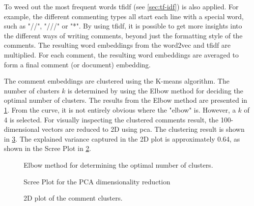 To weed out the most frequent words \acrfull{tfidf} (see \cref{sec:tf-idf}) is also applied. For example, the different commenting types all start each line with a special word, such as "//", "///" or "*". By using \acrshort{tfidf}, it is possible to get more insights into the different ways of writing comments, beyond just the formatting style of the comments. The resulting word embeddings from the word2vec and \acrshort{tfidf} are multiplied. For each comment, the resulting word embeddings are averaged to form a final comment (or document) embedding.

The comment embeddings are clustered using the K-means algorithm. The number of clusters \(k\) is determined by using the Elbow method for deciding the optimal number of clusters. The results from the Elbow method are presented in \cref{fig:elbow}. From the curve, it is not entirely obvious where the "elbow" is. However, a \(k\) of 4 is selected. For visually inspecting the clustered comments result, the 100-dimensional vectors are reduced to 2D using \acrfull{pca}. The clustering result is shown in \cref{fig:comment-clusters}. The explained variance captured in the 2D plot is approximately 0.64, as shown in the Scree Plot in \cref{fig:scree-plot}.


\begin{figure}[htbp]
    \centering
    
    \caption{Elbow method for determining the optimal number of clusters.}
    \label{fig:elbow}
\end{figure}

\begin{figure}[htbp]
    \centering
    
    \caption{Scree Plot for the PCA dimensionality reduction}
    \label{fig:scree-plot}
\end{figure}


\begin{figure}[htbp]
    \centering
    
    \caption{2D plot of the comment clusters.}
    \label{fig:comment-clusters}
\end{figure}

